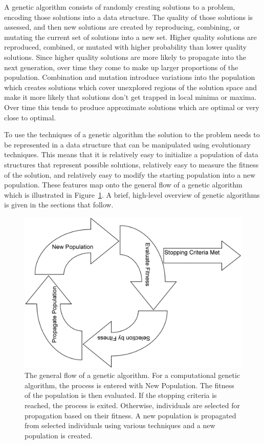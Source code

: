 A genetic algorithm consists of randomly creating solutions to a problem,
encoding those solutions into a data structure. The quality of those solutions
is assessed, and then new solutions are created by reproducing, combining, or
mutating the current set of solutions into a new set. Higher quality solutions
are reproduced, combined, or mutated with higher probability than lower quality
solutions. Since higher quality solutions are more likely to propagate into the
next generation, over time they come to make up larger proportions of the
population. Combination and mutation introduce variations into the population
which creates solutions which cover unexplored regions of the solution space and
make it more likely that solutions don't get trapped in local minima or maxima. Over
time this tends to produce approximate solutions which are optimal or very
close to optimal.

To use the techniques of a genetic algorithm the solution to the problem needs
to be represented in a data structure that can be manipulated using evolutionary
techniques. This means that it is relatively easy to initialize a population of
data structures that represent possible solutions, relatively easy to measure
the fitness of the solution, and relatively easy to modify the starting
population into a new population. These features map onto the general flow of a
genetic algorithm which is illustrated in Figure~\ref{figure-gaflow}. A brief,
high-level overview of genetic algorithms is given in the sections that follow.

\begin{figure}[htp]
\centerline{\includegraphics[width=1.0\columnwidth]{Figures/GAFlow.png}}
\caption[Genetic Algorithm Flow]{The general flow of a genetic algorithm. For a
computational genetic algorithm, the process is entered with New Population.
The fitness of the population is then evaluated. If the stopping criteria is
reached, the process is exited. Otherwise, individuals are selected for
propagation based on their fitness. A new population is propagated from
selected individuals using various techniques and a new population is created.}
\label{figure-gaflow}
\end{figure}

